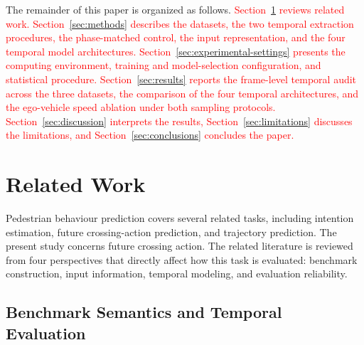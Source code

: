 \documentclass[mti,article,submit,moreauthors]{Definitions/mdpi}
\begin{document}
The remainder of this paper is organized as follows. %
\textcolor{red}{Section~\ref{sec:related_work} reviews related work. Section~\ref{sec:methods} describes the datasets, the two temporal extraction procedures, the phase-matched control, the input representation, and the four temporal model architectures. Section~\ref{sec:experimental-settings} presents the computing environment, training and model-selection configuration, and statistical procedure. Section~\ref{sec:results} reports the frame-level temporal audit across the three datasets, the comparison of the four temporal architectures, and the ego-vehicle speed ablation under both sampling protocols. Section~\ref{sec:discussion} interprets the results, Section~\ref{sec:limitations} discusses the limitations, and Section~\ref{sec:conclusions} concludes the paper.
}

\section{Related Work}
\label{sec:related_work}

Pedestrian behaviour prediction covers several related tasks, including intention estimation, future crossing-action prediction, and trajectory prediction. The present study concerns future crossing action. The related literature is reviewed from four perspectives that directly affect how this task is evaluated: benchmark construction, input information, temporal modeling, and evaluation reliability.

\subsection{Benchmark Semantics and Temporal Evaluation}
\end{document}
